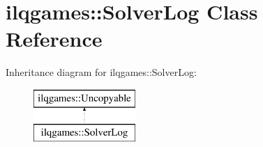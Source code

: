 \hypertarget{classilqgames_1_1_solver_log}{}\section{ilqgames\+:\+:Solver\+Log Class Reference}
\label{classilqgames_1_1_solver_log}
Inheritance diagram for ilqgames\+:\+:Solver\+Log\+:\begin{figure}[H]
\begin{center}
\leavevmode
\includegraphics[height=2.000000cm]{classilqgames_1_1_solver_log}
\end{center}
\end{figure}
